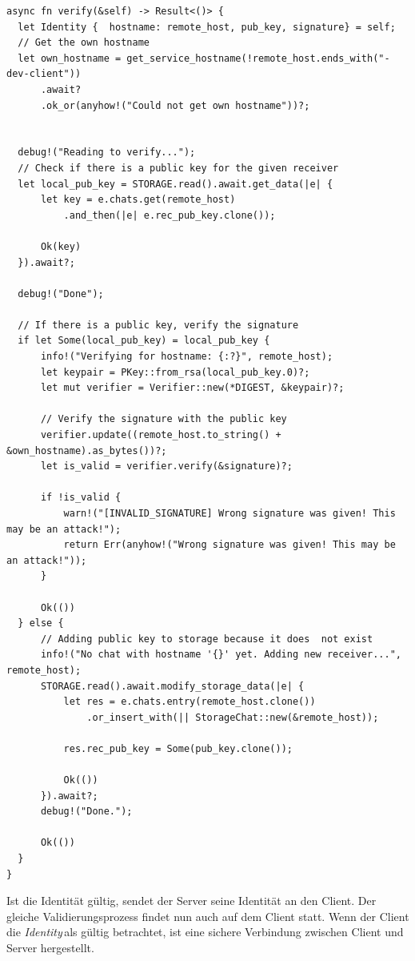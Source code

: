 \documentclass[a4paper,ngerman, headheight=28pt,12pt, footheight=27pt]{scrartcl}
\newcommand{\identity}{\textit{Identity\,}}
\begin{document}
\begin{verbatim}
async fn verify(&self) -> Result<()> {
  let Identity {  hostname: remote_host, pub_key, signature} = self;
  // Get the own hostname
  let own_hostname = get_service_hostname(!remote_host.ends_with("-dev-client"))
      .await?
      .ok_or(anyhow!("Could not get own hostname"))?;


  debug!("Reading to verify...");
  // Check if there is a public key for the given receiver
  let local_pub_key = STORAGE.read().await.get_data(|e| {
      let key = e.chats.get(remote_host)
          .and_then(|e| e.rec_pub_key.clone());

      Ok(key)
  }).await?;

  debug!("Done");

  // If there is a public key, verify the signature
  if let Some(local_pub_key) = local_pub_key {
      info!("Verifying for hostname: {:?}", remote_host);
      let keypair = PKey::from_rsa(local_pub_key.0)?;
      let mut verifier = Verifier::new(*DIGEST, &keypair)?;

      // Verify the signature with the public key
      verifier.update((remote_host.to_string() + &own_hostname).as_bytes())?;
      let is_valid = verifier.verify(&signature)?;

      if !is_valid {
          warn!("[INVALID_SIGNATURE] Wrong signature was given! This may be an attack!");
          return Err(anyhow!("Wrong signature was given! This may be an attack!"));
      }

      Ok(())
  } else {
      // Adding public key to storage because it does  not exist
      info!("No chat with hostname '{}' yet. Adding new receiver...", remote_host);
      STORAGE.read().await.modify_storage_data(|e| {
          let res = e.chats.entry(remote_host.clone())
              .or_insert_with(|| StorageChat::new(&remote_host));

          res.rec_pub_key = Some(pub_key.clone());

          Ok(())
      }).await?;
      debug!("Done.");

      Ok(())
  }
}
\end{verbatim}
Ist die Identität gültig, sendet der Server seine Identität an den Client. Der gleiche Validierungsprozess findet nun auch auf dem Client statt. Wenn der Client die \identity als gültig betrachtet, ist eine sichere Verbindung zwischen Client und Server hergestellt.
\end{document}
